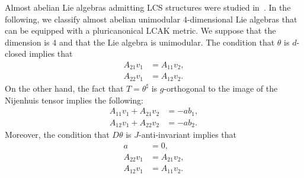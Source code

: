 \documentclass[a4paper,11pt]{amsart}
\theoremstyle{definition}
\renewcommand{\[}{\begin{equation*}}
\renewcommand{\]}{\end{equation*}}
\begin{document}
    Almost abelian Lie algebras admitting LCS structures were studied in~\cite{MR3763412}. In the following, we classify almost abelian unimodular $4$-dimensional Lie algebras that can be equipped with a pluricanonical LCAK metric. We suppose that the dimension is $4$ and that the Lie algebra is unimodular. The condition that $\theta$ is $d$-closed implies that
    \begin{align*}
    A_{21}v_1&=A_{11}v_2,\\
    A_{22}v_1&=A_{12}v_2.
    \end{align*}
    On the other hand, the fact that $T=\theta^\sharp$ is $g$-orthogonal to the image of the Nijenhuis tensor implies the following:
    \begin{align*}
    A_{11}v_1+A_{21}v_2&=-ab_1,\\
    A_{12}v_1+A_{22}v_2&=-ab_2.
    \end{align*}
    Moreover, the condition that $D\theta$ is $J$-anti-invariant implies that 
    \begin{align*}
    a&=0,\\
    A_{22}v_1&=A_{21}v_2,\\
    A_{12}v_1&=A_{11}v_2.
    \end{align*} 
    
\end{document}
